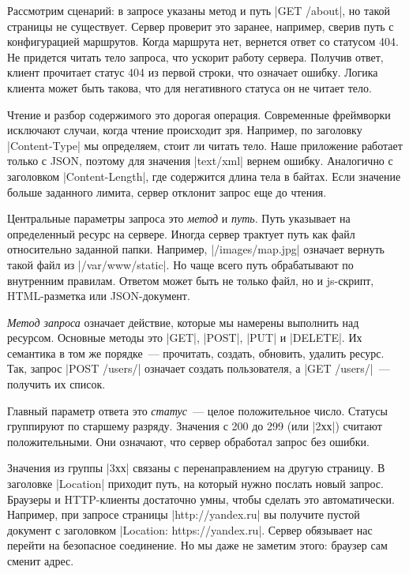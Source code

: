 Рассмотрим сценарий: в запросе указаны метод и путь \spverb|GET /about|, но
такой страницы не существует. Сервер проверит это заранее, например, сверив путь
с конфигурацией маршрутов. Когда маршрута нет, вернется ответ со статусом
404. Не придется читать тело запроса, что ускорит работу сервера. Получив ответ,
клиент прочитает статус 404 из первой строки, что означает ошибку. Логика
клиента может быть такова, что для негативного статуса он не читает тело.

Чтение и разбор содержимого это дорогая операция. Современные фреймворки
исключают случаи, когда чтение происходит зря. Например, по заголовку
\spverb|Content-Type| мы определяем, стоит ли читать тело. Наше приложение
работает только с JSON, поэтому для значения \spverb|text/xml| вернем
ошибку. Аналогично с заголовком \spverb|Content-Length|, где содержится длина
тела в байтах. Если значение больше заданного лимита, сервер отклонит запрос еще
до чтения.

Центральные параметры запроса это \emph{метод} и \emph{путь}. Путь указывает на
определенный ресурс на сервере. Иногда сервер трактует путь как файл
относительно заданной папки. Например, \spverb|/images/map.jpg| означает вернуть
такой файл из \spverb|/var/www/static|. Но чаще всего путь обрабатывают по
внутренним правилам. Ответом может быть не только файл, но и js-скрипт,
HTML-разметка или JSON-документ.

\emph{Метод запроса} означает действие, которые мы намерены выполнить над
ресурсом. Основные методы это \spverb|GET|, \spverb|POST|, \spverb|PUT| и
\spverb|DELETE|. Их семантика в том же порядке~--- прочитать, создать, обновить,
удалить ресурс. Так, запрос \spverb|POST /users/| означает создать пользователя,
а \spverb|GET /users/|~--- получить их список.

Главный параметр ответа это \emph{статус}~--- целое положительное число. Статусы
группируют по старшему разряду. Значения с 200 до 299 (или \spverb|2хх|) считают
положительными. Они означают, что сервер обработал запрос без ошибки.

Значения из группы \spverb|3хх| связаны с перенаправлением на другую страницу.
В заголовке \spverb|Location| приходит путь, на который нужно послать
новый запрос. Браузеры и HTTP-клиенты достаточно умны, чтобы сделать это
автоматически. Например, при запросе страницы \spverb|http://yandex.ru| вы
получите пустой документ с заголовком \spverb|Location: https://yandex.ru|.
Сервер обязывает нас перейти на безопасное соединение. Но мы даже не заметим
этого: браузер сам сменит адрес.

